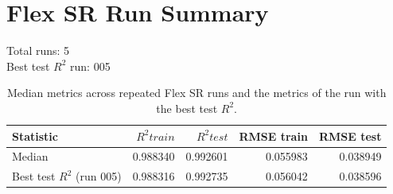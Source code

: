 \documentclass{article}
\begin{document}
\section*{Flex SR Run Summary}
Total runs: 5\\
Best test $R^2$ run: 005\\
\begin{table}[ht]
\centering
\begin{tabular}{lrrrr}
\toprule
Statistic & $R^2 train$ & $R^2 test$ & RMSE train & RMSE test \\
\midrule
Median & 0.988340 & 0.992601 & 0.055983 & 0.038949 \\
Best test $R^2$ (run 005) & 0.988316 & 0.992735 & 0.056042 & 0.038596 \\
\bottomrule
\end{tabular}
\caption{Median metrics across repeated Flex SR runs and the metrics of the run with the best test $R^2$.}
\end{table}
\end{document}
